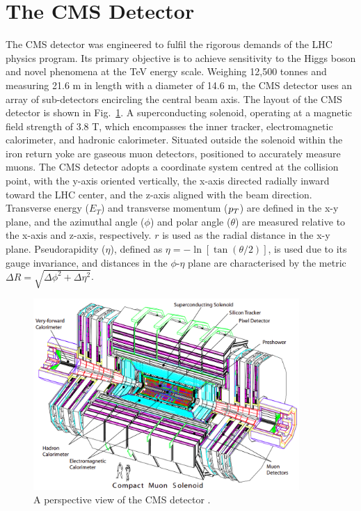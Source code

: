 \section{The CMS Detector}

The \ac{CMS} detector was engineered to fulfil the rigorous demands of the \ac{LHC} physics program. 
Its primary objective is to achieve sensitivity to the Higgs boson and novel phenomena at the TeV energy scale. 
Weighing 12,500 tonnes and measuring 21.6 m in length with a diameter of 14.6 m, the \ac{CMS} detector uses an array of sub-detectors encircling the central beam axis. 
The layout of the \ac{CMS} detector is shown in Fig.~\ref{fig:CMS_Schematic}.
A superconducting solenoid, operating at a magnetic field strength of 3.8 T, which encompasses the inner tracker, electromagnetic calorimeter, and hadronic calorimeter. 
Situated outside the solenoid within the iron return yoke are gaseous muon detectors, positioned to accurately measure muons. 
The \ac{CMS} detector adopts a coordinate system centred at the collision point, with the y-axis oriented vertically, the x-axis directed radially inward toward the \ac{LHC} center, and the z-axis aligned with the beam direction. 
Transverse energy ($E_T$) and transverse momentum ($p_{T}$) are defined in the x-y plane, and the azimuthal angle ($\phi$) and polar angle ($\theta$) are measured relative to the x-axis and z-axis, respectively. 
$r$ is used as the radial distance in the x-y plane.
Pseudorapidity ($\eta$), defined as $\eta = -\ln[\tan(\theta/2)]$, is used due to its gauge invariance, and distances in the $\phi$-$\eta$ plane are characterised by the metric $\Delta R = \sqrt{\Delta\phi^2 + \Delta\eta^2}$. 

\begin{figure}[h]
    \centering
    \includegraphics[width=0.9\textwidth]{Figures/CMS_Detector.png}
    \caption{A perspective view of the \ac{CMS} detector \cite{CMS_Setup}.}
    \label{fig:CMS_Schematic}
\end{figure}

